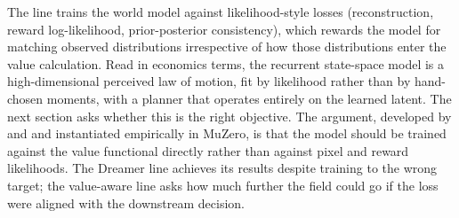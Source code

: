 The line trains the world model against likelihood-style losses (reconstruction, reward log-likelihood, prior-posterior consistency), which rewards the model for matching observed distributions irrespective of how those distributions enter the value calculation. Read in economics terms, the recurrent state-space model is a high-dimensional perceived law of motion, fit by likelihood rather than by hand-chosen moments, with a planner that operates entirely on the learned latent. The next section asks whether this is the right objective. The argument, developed by \citet{FarahmandVAML2017} and \citet{GrimmVALEQ2020} and instantiated empirically in MuZero, is that the model should be trained against the value functional directly rather than against pixel and reward likelihoods. The Dreamer line achieves its results despite training to the wrong target; the value-aware line asks how much further the field could go if the loss were aligned with the downstream decision.
